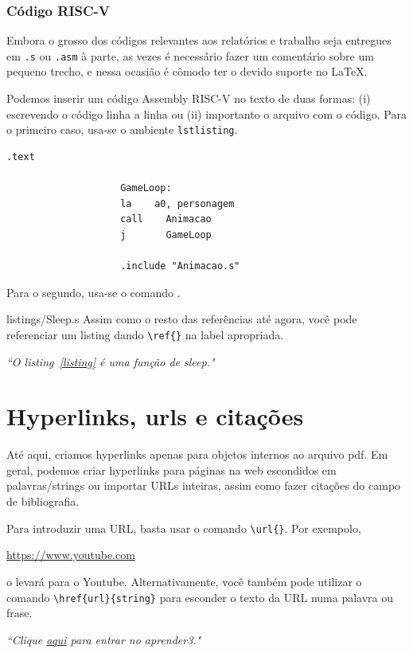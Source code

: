 \documentclass[9pt, twocolumn]{extarticle}
\begin{document}
			\subsubsection{Código RISC-V}
				Embora o grosso dos códigos relevantes aos relatórios e trabalho seja entregues em {\tt.s} ou {\tt.asm} à parte, as vezes é necessário fazer um comentário sobre um pequeno trecho, e nessa ocasião é cômodo ter o devido suporte no \LaTeX.
				
				Podemos inserir um código Assembly RISC-V no texto de duas formas:
				(i) escrevendo o código linha a linha ou 
				(ii) importanto o arquivo com o código.
				Para o primeiro caso, usa-se o ambiente {\tt lstlisting}.
				\begin{lstlisting}[caption={Trecho de código Assembly RISC-V}]
				.text
				
					GameLoop:
					la	  a0, personagem
					call	Animacao
					j	    GameLoop					
					
					.include "Animacao.s"
				\end{lstlisting}
				Para o segundo, usa-se o comando \verb||.
				
				                {listings/Sleep.s}
				Assim como o resto das referências até agora, você pode referenciar um listing dando \verb|\ref{}| na label apropriada. 
				
				\textit{``O listing~\ref{listing} é uma função de sleep."}
	
	\section{Hyperlinks, urls e citações}  
	\label{sec:hyperlinks}
		Até aqui, criamos hyperlinks apenas para objetos internos ao arquivo pdf.
		Em geral, podemos criar hyperlinks para páginas na web escondidos em palavras/strings ou importar URLs inteiras, assim como fazer citações do campo de bibliografia.
		
		Para introduzir uma URL, basta usar o comando \verb|\url{}|. 
		Por exempolo,
		
		\url{https://www.youtube.com}
		
		o levará para o Youtube.
		Alternativamente, você também pode utilizar o comando \verb|\href{url}{string}| para esconder o texto da URL numa palavra ou frase. 
		
		\textit{``Clique \href{https://aprender3.unb.br/login/index.php}{aqui} para entrar no aprender3."}
	          
\end{document}
